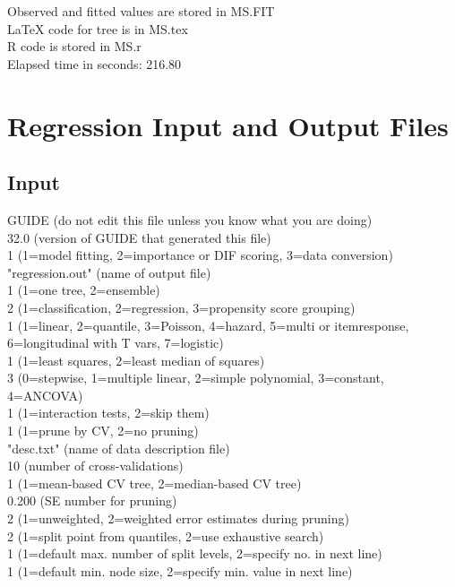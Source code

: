 \documentclass[12pt]{article}
\begin{document}
 Observed and fitted values are stored in MS.FIT\\
 LaTeX code for tree is in MS.tex\\
 R code is stored in MS.r\\
 Elapsed time in seconds: 216.80\\
\section{Regression Input and Output Files}
\subsection{Input}
GUIDE       (do not edit this file unless you know what you are doing)\\
  32.0      (version of GUIDE that generated this file)\\
 1          (1=model fitting, 2=importance or DIF scoring, 3=data conversion)\\
"regression.out"  (name of output file)\\
 1          (1=one tree, 2=ensemble)\\
 2          (1=classification, 2=regression, 3=propensity score grouping)\\
 1          (1=linear, 2=quantile, 3=Poisson, 4=hazard, 5=multi or itemresponse, 6=longitudinal with T vars, 7=logistic)\\
 1          (1=least squares, 2=least median of squares)\\
 3          (0=stepwise, 1=multiple linear, 2=simple polynomial, 3=constant, 4=ANCOVA)\\
 1          (1=interaction tests, 2=skip them)\\
 1          (1=prune by CV, 2=no pruning)\\
"desc.txt"  (name of data description file)\\
        10  (number of cross-validations)\\
 1          (1=mean-based CV tree, 2=median-based CV tree)\\
     0.200  (SE number for pruning)\\
 2          (1=unweighted, 2=weighted error estimates during pruning)\\
 2          (1=split point from quantiles, 2=use exhaustive search)\\
 1          (1=default max. number of split levels, 2=specify no. in next line)\\
 1          (1=default min. node size, 2=specify min. value in next line)\\
\end{document}
